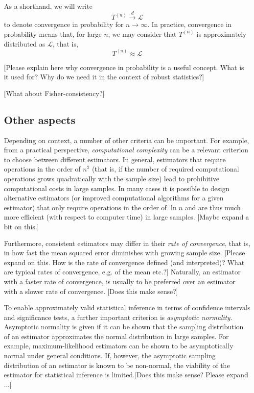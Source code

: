 As a shorthand, we will write
\[
    T^{(n)} \stackrel{d}{\rightarrow} \mathcal{L}
\]
to denote convergence in probability for $n \rightarrow \infty$. In practice, 
convergence in probability means that, for large $n$, we may consider that
$T^{(n)}$ is approximately distributed as $\mathcal{L}$, that is,
\[
    T^{(n)} \approx \mathcal{L}
\]

\alert{[Please explain here why convergence in probability is a useful
concept. What is it used for? Why do we need it in the context of robust
statistics?]}

\alert{[What about Fisher-consistency?]}

\subsection{Other aspects}

Depending on context, a number of other criteria can be important. For example,
from a practical perspective, \emph{computational complexity} can be a relevant
criterion to choose between different estimators. In general, estimators that
require operations in the order of $n^2$ (that is, if the number of required
computational operations grows quadratically with the sample size) lead to
prohibitive computational costs in large samples. In many cases it is possible
to design alternative estimators (or improved computational algorithms
for a given estimator) that only require operations in the order of $\ln n$ and
are thus much more efficient (with respect to computer time) in large samples.
\alert{[Maybe expand a bit on this.]}

Furthermore, consistent estimators may differ in their \emph{rate of
convergence}, that is, in how fast the mean squared error diminishes with
growing sample size. \alert{[Please expand on this. How is the rate of
convergence defined (and interpreted)? What are typical rates of convergence,
e.g. of the mean etc.?]} Naturally, an estimator with a faster rate of
convergence, is usually to be preferred over an estimator with a slower rate of
convergence. \alert{[Does this make sense?]}

To enable approximately valid statistical inference in terms of confidence
intervals and significance tests, a further important criterion is
\emph{asymptotic normality}. Asymptotic normality is given if it can be shown
that the sampling distribution of an estimator approximates the normal
distribution in large samples. For example, maximum-likelihood estimators can
be shown to be asymptotically normal under general conditions. If,
however, the asymptotic sampling distribution of an estimator is known to be 
non-normal, the viability of the estimator for statistical inference is 
limited.\alert{[Does this make sense? Please expand ...]}

